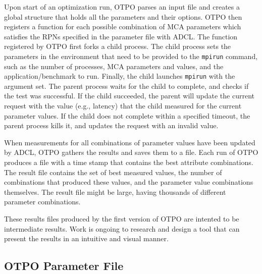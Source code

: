 
Upon start of an optimization run, OTPO parses an input file %
and creates a global structure that holds all the
parameters and their options. OTPO then registers a function for each possible combination of MCA parameters which satisfies the RPNs specified in the parameter file with ADCL. The function registered by OTPO first forks a child process. The child process sets the parameters in the environment that
need to be provided to the {\tt mpirun} command, such as the number of processes, MCA parameters and values, and the   application/benchmark to run. Finally, the child launches {\tt mpirun} with the argument set. The parent process waits for the child to complete, and checks if the test was successful. %
If the child succeeded, the parent will update the current request with the value (e.g., latency) that the child measured for the current parameter values. If the child does not complete within a specified timeout, the parent process kills it, and updates the request with an invalid value.

When measurements for all combinations of parameter values have been
updated by ADCL, OTPO gathers the results and saves
them to a file. Each run of OTPO produces a file with a time stamp
that contains the best attribute combinations. The result file
contains the set of best measured values, the number of combinations
that produced these values, and the parameter value combinations
themselves. The result file might be large, having thousands of
different parameter combinations.

These results files produced by the first version of OTPO are intented
to be intermediate results.  Work is ongoing to research and design a
tool that can present the results in an intuitive and visual manner.


\subsection{OTPO Parameter File}

